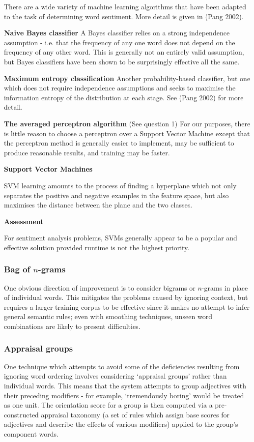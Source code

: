\documentclass[11pt]{article}
\begin{document}
There are a wide variety of machine learning algorithms that have been adapted to the task of determining word sentiment. More detail is given in (Pang 2002)\cite{Pang2002}.

\textbf{Naive Bayes classifier}
A Bayes classifier relies on a strong independence assumption - i.e. that the
frequency of any one word does not depend on the frequency of any other word.
This is generally not an entirely valid assumption, but Bayes classifiers have
been shown to be surprisingly effective all the same.

\textbf{Maximum entropy classification}
Another probability-based classifier, but one which does not require independence assumptions and seeks to maximise the information entropy of the distribution at each stage. See (Pang 2002)\cite{Pang2002} for more detail. 

\textbf{The averaged perceptron algorithm}
(See question 1)
For our purposes, there is little reason to choose a perceptron over a Support
Vector Machine except that the perceptron method is generally easier to
implement, may be sufficient to produce reasonable results, and training may
be faster.

\textbf{Support Vector Machines}

SVM learning amounts to the process of finding a hyperplane which not only
separates the positive and negative examples in the feature space, but also
maximises the distance between the plane and the two classes.

\textbf{Assessment}

For sentiment analysis problems, SVMs generally appear to be a popular and
effective solution provided runtime is not the highest priority.

\subsubsection*{Bag of $n$-grams}
One obvious direction of improvement is to consider bigrams or $n$-grams in
place of individual words. This mitigates the problems caused by ignoring
context, but requires a larger training corpus to be effective since it makes
no attempt to infer general semantic rules; even with smoothing techniques,
unseen word combinations are likely to present difficulties.

\subsubsection*{Appraisal groups}
One technique which attempts to avoid some of the deficiencies resulting from
ignoring word ordering involves considering `appraisal
groups'\cite{Whitelaw2005} rather than individual words. This means that the
system attempts to group adjectives with their preceding modifiers - for
example, `tremendously boring' would be treated as one unit. The orientation
score for a group is then computed via a pre-constructed appraisal taxonomy (a
set of rules which assign base scores for adjectives and describe the effects
of various modifiers) applied to the group's component words.
\end{document}
